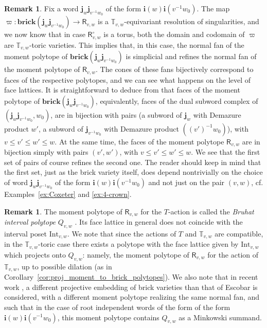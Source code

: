 \documentclass[a4paper, 11pt]{amsart}
\newcommand{\brick}{\mathbf{brick}}
\newcommand{\orich}[1]{\mathsf{R}^{\circ}_{#1}}
\newcommand{\rich}[1]{\mathsf{R}_{#1}}
\newcommand{\word}[1]{\mathbf{#1}}
\newcommand{\dil}[1]{\mathbb{T}_{#1}}
\theoremstyle{definition}
\newtheorem{remark}[theorem]{Remark}
\begin{document}
\begin{remark}
Fix a word $\word{j}_w \word{j}_{v^{-1}w_0}$ of the form $\word{i}(w)\word{i}(v^{-1}w_0)$.
The map $\varpi: \brick(\word{j}_w \word{j}_{v^{-1}w_0}) \to \rich{v,w}$ is a $\dil{v,w}$-equivariant resolution of singularities, and we now know that in case $\orich{v,w}$ is a torus, both the domain and codomain of $\varpi$ are $\dil{v,w}$-toric varieties. This implies that, in this case, the normal fan of the moment polytope of $ \brick(\word{j}_w \word{j}_{v^{-1}w_0})$ is simplicial and refines the  normal fan of the moment polytope of $\rich{v,w}$.
The cones of these fans bijectively correspond to faces of the respective polytopes, and we can see what happens on the level of face lattices. It is straightforward to deduce from \cite[Lemma 2.1]{splicing2} that faces of the moment polytope of $ \brick(\word{j}_w \word{j}_{v^{-1}w_0})$, equivalently, faces of the dual subword complex of $(\word{j}_w \word{j}_{v^{-1}w_0}, w_0)$, are in bijection with pairs (a subword of $\word{j}_w$ with Demazure product $w'$, a subword of $\word{j}_{v^{-1}w_0}$ with Demazure product $((v')^{-1} w_0)$), with $v \leq v' \leq w' \leq w$. At the same time, the faces of the moment polytope $\rich{v,w}$ are in bijection simply with pairs $(v',w')$, with $v \leq v' \leq w' \leq w$.
We see that the first set of pairs of course refines the second one. The reader should keep in mind that the first set, just as the brick variety itself, does depend nontrivially on the choice of word  $\word{j}_w \word{j}_{v^{-1}w_0}$ of the form $\word{i}(w)\word{i}(v^{-1}w_0)$ and not just on the pair $(v, w)$, cf. Examples~\ref{ex:Coxeter} and \ref{ex:4-crown}.
\end{remark}

\begin{remark}
The moment polytope of $\rich{v,w}$ for the $T$-action is called the \emph{Bruhat interval polytope} $Q_{v,w}$ \cite{KW, TW}. Its face lattice in general does not coincide with the interval poset $\mathrm{Int}_{v,w}$. We note that since the actions of $T$ and $\dil{v,w}$ are compatible, in the $\dil{v,w}$-toric case there exists a polytope with the face lattice given by  $\mathrm{Int}_{v,w}$ which projects onto $Q_{v,w}$: namely, the moment polytope of $\rich{v,w}$ for the action of $\dil{v,w}$, up to possible dilation (as in Corollary~\ref{cor:proj_moment_to_brick_polytopes}). We also note that in recent work \cite{GU}, a different projective embedding of brick varieties than that of Escobar is considered, with a different moment polytope realizing the same normal fan, and such that in the case of root independent words of the form of the form $\word{i}(w)\word{i}(v^{-1}w_0)$, this moment polytope contains $Q_{v,w}$ as a Minkowski summand.
\end{remark}
\end{document}
